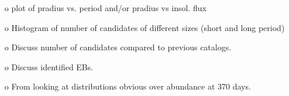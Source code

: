 \begin{itemize}
    \item [o] plot of pradius vs. period and/or pradius vs insol. flux
    \item [o] Histogram of number of candidates of different sizes (short and long period)
    \item [o] Discuss number of candidates compared to previous catalogs.
    \item [o] Discuss identified EBs.
    \item [o] From looking at distributions obvious over abundance at 370 days.
\end{itemize}